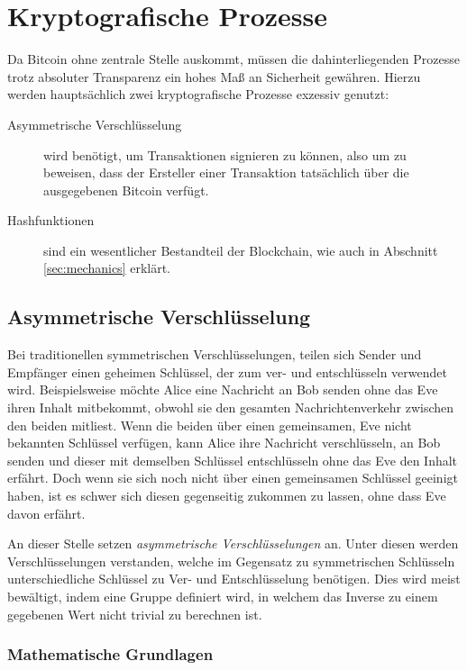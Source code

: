 \section{Kryptografische Prozesse}

Da Bitcoin ohne zentrale Stelle auskommt, müssen die dahinterliegenden Prozesse trotz absoluter Transparenz ein hohes Maß an Sicherheit gewähren.
Hierzu werden hauptsächlich zwei kryptografische Prozesse exzessiv genutzt:
\begin{description}
    \item[Asymmetrische Verschlüsselung] wird benötigt, um Transaktionen signieren zu können, also um zu beweisen, dass der Ersteller einer Transaktion tatsächlich über die ausgegebenen Bitcoin verfügt.
    \item[Hashfunktionen] sind ein wesentlicher Bestandteil der Blockchain, wie auch in Abschnitt \ref{sec:mechanics} erklärt.
\end{description}

\subsection{Asymmetrische Verschlüsselung}

Bei traditionellen symmetrischen Verschlüsselungen, teilen sich Sender und Empfänger einen geheimen Schlüssel, der zum ver- und entschlüsseln verwendet wird.
Beispielsweise möchte Alice eine Nachricht an Bob senden ohne das Eve ihren Inhalt mitbekommt, obwohl sie den gesamten Nachrichtenverkehr zwischen den beiden mitliest.
Wenn die beiden über einen gemeinsamen, Eve nicht bekannten Schlüssel verfügen, kann Alice ihre Nachricht verschlüsseln, an Bob senden und dieser mit demselben Schlüssel entschlüsseln ohne das Eve den Inhalt erfährt.
Doch wenn sie sich noch nicht über einen gemeinsamen Schlüssel geeinigt haben, ist es schwer sich diesen gegenseitig zukommen zu lassen, ohne dass Eve davon erfährt.

An dieser Stelle setzen \emph{asymmetrische Verschlüsselungen} an.
Unter diesen werden Verschlüsselungen verstanden, welche im Gegensatz zu symmetrischen Schlüsseln unterschiedliche Schlüssel zu Ver- und Entschlüsselung benötigen.
Dies wird meist bewältigt, indem eine Gruppe definiert wird, in welchem das Inverse zu einem gegebenen Wert nicht trivial zu berechnen ist.

\subsubsection{Mathematische Grundlagen}

